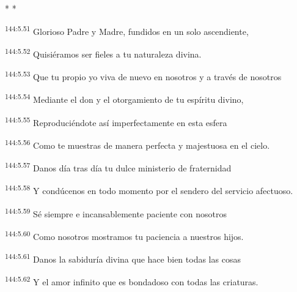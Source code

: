 \begin{center}
	\par* * *
\end{center}

\begin{center}
\par
\textsuperscript{144:5.51} Glorioso Padre y Madre, fundidos en un solo ascendiente,

\par
\textsuperscript{144:5.52} Quisiéramos ser fieles a tu naturaleza divina.

\par
\textsuperscript{144:5.53} Que tu propio yo viva de nuevo en nosotros y a través de nosotros

\par
\textsuperscript{144:5.54} Mediante el don y el otorgamiento de tu espíritu divino,

\par
\textsuperscript{144:5.55} Reproduciéndote así imperfectamente en esta esfera

\par
\textsuperscript{144:5.56} Como te muestras de manera perfecta y majestuosa en el cielo.

\par
\textsuperscript{144:5.57} Danos día tras día tu dulce ministerio de fraternidad

\par
\textsuperscript{144:5.58} Y condúcenos en todo momento por el sendero del servicio afectuoso.

\par
\textsuperscript{144:5.59} Sé siempre e incansablemente paciente con nosotros

\par
\textsuperscript{144:5.60} Como nosotros mostramos tu paciencia a nuestros hijos.

\par
\textsuperscript{144:5.61} Danos la sabiduría divina que hace bien todas las cosas

\par
\textsuperscript{144:5.62} Y el amor infinito que es bondadoso con todas las criaturas.


\end{center}
